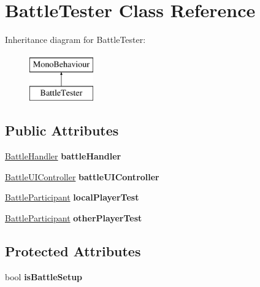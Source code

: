 \hypertarget{class_battle_tester}{\section{Battle\-Tester Class Reference}
\label{class_battle_tester}
}
Inheritance diagram for Battle\-Tester\-:\begin{figure}[H]
\begin{center}
\leavevmode
\includegraphics[height=2.000000cm]{class_battle_tester}
\end{center}
\end{figure}
\subsection*{Public Attributes}
\begin{DoxyCompactItemize}
\item 
\hypertarget{class_battle_tester_a87c03ddd5b47eb2881580fa62588660f}{\hyperlink{class_battle_handler}{Battle\-Handler} {\bfseries battle\-Handler}}\label{class_battle_tester_a87c03ddd5b47eb2881580fa62588660f}

\item 
\hypertarget{class_battle_tester_ab0a3a610e839111f2a5d460c9c140a1f}{\hyperlink{class_battle_u_i_controller}{Battle\-U\-I\-Controller} {\bfseries battle\-U\-I\-Controller}}\label{class_battle_tester_ab0a3a610e839111f2a5d460c9c140a1f}

\item 
\hypertarget{class_battle_tester_ad602b424310978effe2bed83ff7e9571}{\hyperlink{class_battle_participant}{Battle\-Participant} {\bfseries local\-Player\-Test}}\label{class_battle_tester_ad602b424310978effe2bed83ff7e9571}

\item 
\hypertarget{class_battle_tester_a9667e7e35242d772a7089a27027da3c0}{\hyperlink{class_battle_participant}{Battle\-Participant} {\bfseries other\-Player\-Test}}\label{class_battle_tester_a9667e7e35242d772a7089a27027da3c0}

\end{DoxyCompactItemize}
\subsection*{Protected Attributes}
\begin{DoxyCompactItemize}
\item 
\hypertarget{class_battle_tester_a39cd5d1c4a86ae22eb25d9a6d6674db9}{bool {\bfseries is\-Battle\-Setup}}\label{class_battle_tester_a39cd5d1c4a86ae22eb25d9a6d6674db9}

\end{DoxyCompactItemize}
